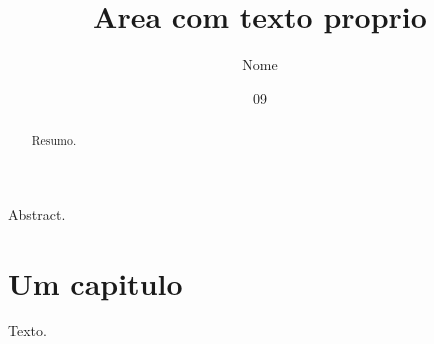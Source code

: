 \documentclass[dsc]{ufrj}
\title{Area com texto proprio}
\author{Nome}{Sobrenome}
\date{09}{2026}
\begin{document}
  \maketitle
  \frontmatter
  \begin{abstract}Resumo.\end{abstract}
  \begin{foreignabstract}Abstract.\end{foreignabstract}
  \tableofcontents
  \mainmatter
  \chapter{Um capitulo}
  Texto.
\end{document}
